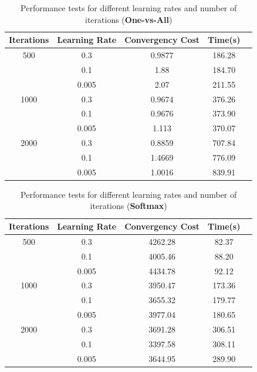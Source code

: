 \documentclass[conference]{IEEEtran}
\begin{document}
\begin{table}[ht!]
 \begin{center}
  \caption{Performance tests for different learning rates and number of iterations (\textbf{One-vs-All})}
  \label{table:table1}
  \begin{tabular}{ |c|c|c|c|c| }
   \hline
    Iterations & Learning Rate & Convergency Cost & Time(s)\\
   \hline
   500 & 0.3 & 0.9877 & 186.28 \\ 
                     & 0.1 & 1.88 & 184.70 \\
                     & 0.005 & 2.07 & 211.55 \\
   \hline
   1000 & 0.3 & 0.9674 &376.26 \\ 
                     & 0.1 & 0.9676 & 373.90 \\
                     & 0.005 & 1.113 & 370.07 \\
   \hline
   2000 & 0.3 & 0.8859 & 707.84 \\ 
                     & 0.1 & 1.4669 & 776.09 \\
                     & 0.005 & 1.0016 & 839.91 \\


 \hline
 \end{tabular}
 \end{center}
\end{table}



\begin{table}[ht!]
 \begin{center}
  \caption{Performance tests for different learning rates and number of iterations (\textbf{Softmax})}
  \label{table:table1}
  \begin{tabular}{ |c|c|c|c|c| }
   \hline
    Iterations & Learning Rate & Convergency Cost & Time(s)\\
   \hline
   500 & 0.3 & 4262.28 & 82.37 \\ 
                     & 0.1 & 4005.46 & 88.20 \\
                     & 0.005 & 4434.78 & 92.12 \\
   \hline
   1000 & 0.3 & 3950.47 & 173.36\\ 
                     & 0.1 & 3655.32 & 179.77 \\
                     & 0.005 & 3977.04 & 180.65 \\
   \hline
   2000 & 0.3 & 3691.28 & 306.51 \\ 
                     & 0.1 & 3397.58 & 308.11 \\
                     & 0.005 & 3644.95 & 289.90 \\


 \hline
 \end{tabular}
 \end{center}
\end{table}
\end{document}
